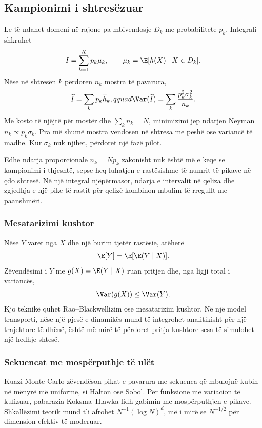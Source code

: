\subsection{Kampionimi i shtresëzuar}
Le të ndahet domeni në rajone pa mbivendosje $D_k$ me probabilitete $p_k$. Integrali shkruhet
\begin{equation}
 I=\sum_{k=1}^{K}p_k\mu_k,
 \qquad \mu_k=\E[h(X)\mid X\in D_k].
\end{equation}
Nëse në shtresën $k$ përdoren $n_k$ mostra të pavarura,
\begin{equation}
 \widehat I=\sum_kp_k\overline h_k,qquad
 \Var(\widehat I)=\sum_k\frac{p_k^2\sigma_k^2}{n_k}.
\end{equation}
Me kosto të njëjtë për mostër dhe $\sum_kn_k=N$, minimizimi jep ndarjen Neyman $n_k\propto p_k\sigma_k$. Pra më shumë mostra vendosen në shtresa me peshë ose variancë të madhe. Kur $\sigma_k$ nuk njihet, përdoret një fazë pilot.

Edhe ndarja proporcionale $n_k=Np_k$ zakonisht nuk është më e keqe se kampionimi i thjeshtë, sepse heq luhatjen e rastësishme të numrit të pikave në çdo shtresë. Në një integral njëpërmasor, ndarja e intervalit në qeliza dhe zgjedhja e një pike të rastit për qelizë kombinon mbulim të rregullt me paanshmëri.

\subsubsection{Mesatarizimi kushtor}
Nëse $Y$ varet nga $X$ dhe një burim tjetër rastësie, atëherë
\begin{equation}
 \E[Y]=\E[\E(Y\mid X)].
\end{equation}
Zëvendësimi i $Y$ me $g(X)=\E(Y\mid X)$ ruan pritjen dhe, nga ligji total i variancës,
\begin{equation}
 \Var(g(X))\le\Var(Y).
\end{equation}
Kjo teknikë quhet Rao--Blackwellizim ose mesatarizim kushtor. Në një model transporti, nëse një pjesë e dinamikës mund të integrohet analitikisht për një trajektore të dhënë, është më mirë të përdoret pritja kushtore sesa të simulohet një hedhje shtesë.

\subsubsection{Sekuencat me mospërputhje të ulët}
Kuazi-Monte Carlo zëvendëson pikat e pavarura me sekuenca që mbulojnë kubin në mënyrë më uniforme, si Halton ose Sobol. Për funksione me variacion të kufizuar, pabarazia Koksma--Hlawka lidh gabimin me mospërputhjen e pikave. Shkallëzimi teorik mund t'i afrohet $N^{-1}(\log N)^d$, më i mirë se $N^{-1/2}$ për dimension efektiv të moderuar.

